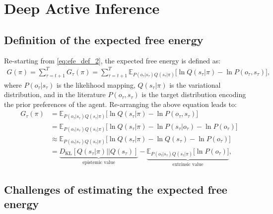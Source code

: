 \documentclass[twoside,11pt]{article}
\newcommand{\kl}[2]{D_{\mathrm{KL}} \left[ \left. \left. #1 \right|\right| #2 \right] }
\begin{document}
\section{Deep Active Inference} \label{sec:DAI}

\subsection{Definition of the expected free energy}

Re-starting from \eqref{eq:efe_def_2}, the expected free energy is defined as:
\begin{align}
G(\pi) = \sum_{\tau = t+1}^T G_\tau(\pi) = \sum_{\tau = t+1}^T \mathbb{E}_{P(o_\tau|s_\tau)Q(s_\tau | \pi)}\big[\ln Q(s_\tau | \pi) - \ln P(o_\tau, s_\tau)\big],\label{eq:efe_definition}
\end{align}
where $P(o_\tau|s_\tau)$ is the likelihood mapping, $Q(s_\tau | \pi)$ is the variational distribution, and in the literature $P(o_\tau, s_\tau)$ is the target distribution encoding the prior preferences of the agent. Re-arranging the above equation leads to:
\begin{align}
G_\tau(\pi) &= \mathbb{E}_{P(o_\tau|s_\tau)Q(s_\tau | \pi)}\big[\ln Q(s_\tau | \pi) - \ln P(o_\tau, s_\tau)\big]\nonumber\\
&= \mathbb{E}_{P(o_\tau|s_\tau)Q(s_\tau | \pi)}\big[\ln Q(s_\tau | \pi) - \ln P(s_\tau|o_\tau)- \ln P(o_\tau)\big]\nonumber\\
&\approx \mathbb{E}_{P(o_\tau|s_\tau)Q(s_\tau | \pi)}\big[\ln Q(s_\tau | \pi) - \ln Q(s_\tau)- \ln P(o_\tau)\big]\nonumber\\
&= \underbrace{\kl{Q(s_\tau | \pi)}{Q(s_\tau)}}_{\text{epistemic value}} - \underbrace{\mathbb{E}_{P(o_\tau|s_\tau)Q(s_\tau | \pi)}\big[\ln P(o_\tau)\big]}_{\text{extrinsic value}},\label{eq:efe_practice}
\end{align}

\subsection{Challenges of estimating the expected free energy}
\end{document}
